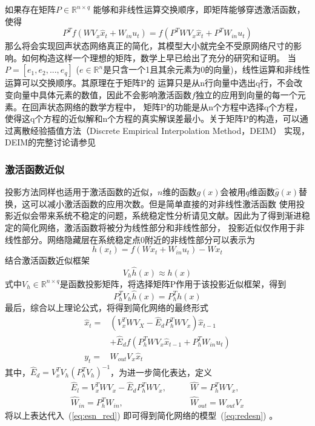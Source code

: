 如果存在矩阵\(P \in \mathbb{R}^{n \times q}\) 能够和非线性运算交换顺序，即矩阵能够穿透激活函数，使得
\begin{equation}
	P^T f(W V_x  \widehat{x}_t + W_{in} u_t) = f(P^T W V_x \widehat{x}_t + P^T W_{in} u_t)	
\end{equation}
那么将会实现回声状态网络真正的简化，其模型大小就完全不受原网络尺寸的影响。如何构造这样一个理想的矩阵，数学上早已给出了充分的研究和证明。
当\(P = [e_1,e_2,...,e_q]\) (\(e \in \mathbb{R}^n\)是只含一个1且其余元素为0的向量)，线性运算和非线性运算可以交换顺序。其原理在于矩阵P的
运算只是从n行向量中选出q行，不会改变向量中具体元素的数值，因此不会影响激活函数\(f\)独立的应用到向量的每一个元素。在回声状态网络的数学方程中，
矩阵P的功能是从n个方程中选择q个方程，使得这q个方程的近似解和n个方程的真实解误差最小。关于矩阵P的构造，可以通过离散经验插值方法（Discrete Empirical Interpolation Method，DEIM）
实现，DEIM的完整讨论请参见

\subsubsection{激活函数近似}
投影方法同样也适用于激活函数的近似，\(n\)维的函数\(g(x)\)会被用\(q\)维函数\(\widehat{g}(x)\)替换，这可以减小激活函数的应用次数。但是简单直接的对非线性激活函数
使用投影近似会带来系统不稳定的问题，系统稳定性分析请见文献。因此为了得到渐进稳定的简化网络，激活函数将被分为线性部分和非线性部分，
投影近似仅作用于非线性部分。网络隐藏层在系统稳定点0附近的非线性部分可以表示为
\begin{equation}\label{eq:h(x)}
	h(x_t) = f(W x_t + W_{in} u_t) - W x_t
\end{equation}
结合激活函数近似框架
\begin{equation}
	V_h \widehat{h}(x) \approx h(x)
\end{equation}
式中\(V_h \in \mathbb{R}^{n \times q}\)是函数投影矩阵，将选择矩阵P作用于该投影近似框架，得到
\begin{equation}\label{eq:Pselect}
	P_h^T V_h \widehat{h}(x) = P_h^T h(x)
\end{equation}
最后，综合以上理论公式，将得到简化网络的最终形式
\begin{equation}\label{eq:esn_red}
	\begin{split}
		\widehat{x}_t  = &(V_x^T W V_X - \widehat{E}_d P_h^T W V_x)\widehat{x}_{t-1}  \\
					     & + \widehat{E}_{d} f(P_h^T W V_x \widehat{x}_{t-1} + P_h^{T} W_{in} u_{t})	\\
				y_t    = &W_{out} V_x \widehat{x}_t
	\end{split}
\end{equation}
其中，\(\widehat{E}_d = V_x^T V_h (P_h^TV_h)^{-1}\)，为进一步简化表达，定义
\begin{equation}
	\begin{split}
		\widehat{E}_l = V_x^T W V_x - \widehat{E}_d P_h^T W V_x,	\qquad &\widehat{W} = P_h^T W V_x,		\\
		\widehat{W}_{in} = P_h^T W_{in},							\qquad &\widehat{W}_{out} = W_{out}V_x
	\end{split}
\end{equation}
将以上表达代入~(\ref{eq:esn_red}) 即可得到简化网络的模型~(\ref{eq:redesn}) 。

